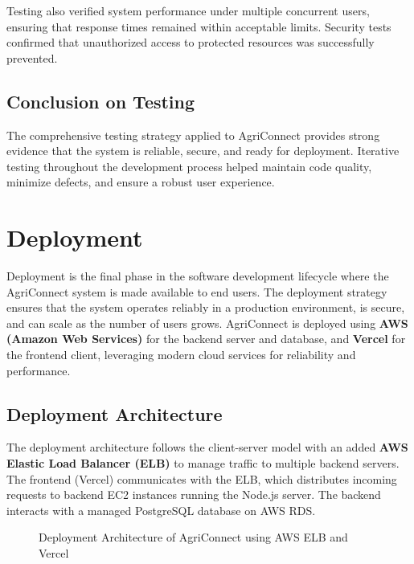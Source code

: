 \documentclass[12pt,a4paper]{article}
\begin{document}
Testing also verified system performance under multiple concurrent users, ensuring that response times remained within acceptable limits. Security tests confirmed that unauthorized access to protected resources was successfully prevented.

\subsection{Conclusion on Testing}

The comprehensive testing strategy applied to AgriConnect provides strong evidence that the system is reliable, secure, and ready for deployment. Iterative testing throughout the development process helped maintain code quality, minimize defects, and ensure a robust user experience.


\section{Deployment}

Deployment is the final phase in the software development lifecycle where the AgriConnect system is made available to end users. The deployment strategy ensures that the system operates reliably in a production environment, is secure, and can scale as the number of users grows. AgriConnect is deployed using \textbf{AWS (Amazon Web Services)} for the backend server and database, and \textbf{Vercel} for the frontend client, leveraging modern cloud services for reliability and performance.

\subsection{Deployment Architecture}

The deployment architecture follows the client-server model with an added \textbf{AWS Elastic Load Balancer (ELB)} to manage traffic to multiple backend servers. The frontend (Vercel) communicates with the ELB, which distributes incoming requests to backend EC2 instances running the Node.js server. The backend interacts with a managed PostgreSQL database on AWS RDS.

\begin{figure}[H]
\centering
{}
\caption{Deployment Architecture of AgriConnect using AWS ELB and Vercel}
\end{figure}
\end{document}
